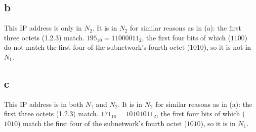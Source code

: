 \documentclass[10pt,a4paper]{article}
\begin{document}
\subsection*{b}
This IP address is only in $N_2$. It is in $N_2$ for similar reasons as in (a): the first three octets (1.2.3) match. $195_{10}=11000011_{2}$, the first four bits of which ($1100$) do not match the first four of the subnetwork's fourth octet ($1010$), so it is not in $N_1$.
\subsection*{c}
This IP address is in both $N_1$ and $N_2$. It is in $N_2$ for similar reasons as in (a): the first three octets (1.2.3) match. $171_{10}=10101011_{2}$, the first four bits of which ($1010$) match the first four of the subnetwork's fourth octet ($1010$), so it is in $N_1$.
\end{document}
